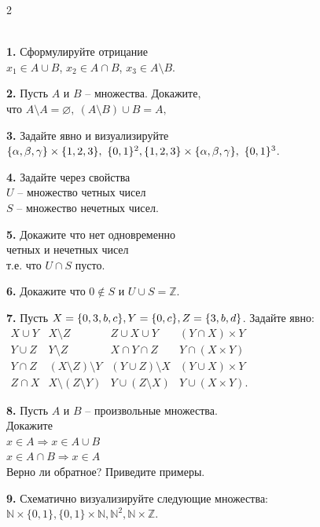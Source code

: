 \begin{multicols}{2}
\begin{exercise}
\ \\
\noindent\textbf{1.}
Сформулируйте отрицание\\
$x_1\in A\cup B$, 
$x_2\in A\cap B$, 
$x_3\in A\setminus B$.

\medskip\noindent\textbf{2.}
Пусть $A$ и $B$ -- множества.
Докажите,\\ что $A\setminus A=\varnothing,\ (A\setminus B)\cup B=A,$

\medskip\noindent\textbf{3.}
Задайте явно и визуализируйте\\
$\{\alpha,\beta,\gamma\}\times\{1,2,3\},\ \{0,1\}^2,\\
\{1,2,3\}\times\{\alpha,\beta,\gamma\},\ \{0,1\}^3$.

\medskip\noindent\textbf{4.}
Задайте через свойства\\
$U$ -- множество четных чисел\\
$S$ -- множество нечетных чисел.

\medskip\noindent\textbf{5.}
Докажите что нет одновременно\\
четных и нечетных чисел\\
т.е. что $U\cap S$ пусто.

\medskip\noindent\textbf{6.}
Докажите что $0\notin S$ и $U\cup S=\mathbb{Z}$.

\medskip\noindent\textbf{7.}
Пусть $X=\{0,3,b,c\},Y=\{0,c\},\\Z=\{3,b,d\}$.
Задайте явно:\\
$\begin{array}{llll}
X\cup Y & X\setminus Z & Z\cup X\cup Y & (Y\cap X)\times Y\\
Y\cup Z & Y\setminus Z & X\cap Y\cap Z & Y\cap (X\times Y)\\
Y\cap Z & (X\setminus Z)\setminus Y & (Y\cup Z)\setminus X & (Y\cup X)\times Y\\
Z\cap X & X\setminus (Z\setminus Y) & Y\cup (Z\setminus X) & Y\cup (X\times Y).
\end{array}$

\medskip\noindent\textbf{8.}
Пусть $A$ и $B$ -- произвольные множества.\\ Докажите\\
$x\in A\Rightarrow x\in A\cup B$\\
$x\in A\cap B\Rightarrow x\in A$\\
Верно ли обратное? Приведите примеры.

\medskip\noindent\textbf{9.}
Схематично визуализируйте следующие множества: 
$\mathbb{N}\times\{0,1\},\{0,1\}\times\mathbb{N},\mathbb{N}^2,\mathbb{N}\times\mathbb{Z}$.
\end{exercise}
\end{multicols}
